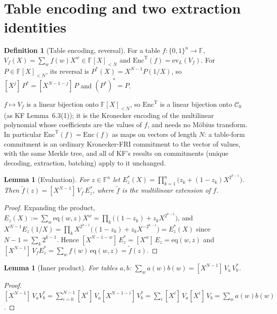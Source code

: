 \documentclass[11pt]{article}
\newtheorem{lemma}[theorem]{Lemma}
\theoremstyle{definition}
\newtheorem{definition}[theorem]{Definition}
\newcommand{\F}{\mathbb{F}}
\newcommand{\coef}[2]{[X^{#1}]\,#2}
\newcommand{\ev}{\mathrm{ev}}
\newcommand{\Cc}{\mathcal{C}}
\begin{document}
\section{Table encoding and two extraction identities}

\begin{definition}[Table encoding, reversal]
For a table $f:\{0,1\}^n\to\F$, $V_f(X)=\sum_{w}f(w)X^{w}\in\F[X]_{<N}$ and $\mathrm{Enc}^{\mathrm T}(f)=\ev_L(V_f)$.
For $P\in\F[X]_{<N}$, its reversal is $P^\ast(X)=X^{N-1}P(1/X)$, so $\coef{j}{P^\ast}=\coef{N-1-j}{P}$ and $(P^\ast)^\ast=P$.
\end{definition}

$f\mapsto V_f$ is a linear bijection onto $\F[X]_{<N}$, so $\mathrm{Enc}^{\mathrm T}$ is a linear bijection onto $\Cc_0$ (as KF Lemma~6.3(1)); it is the Kronecker encoding of the multilinear polynomial whose coefficients are the values of $f$, and needs no M\"obius transform.
In particular $\mathrm{Enc}^{\mathrm T}(f)=\mathrm{Enc}(f)$ as maps on vectors of length $N$: a table-form commitment is an ordinary Kronecker-FRI commitment to the vector of values, with the same Merkle tree, and all of KF's results on commitments (unique decoding, extraction, batching) apply to it unchanged.

\begin{lemma}[Evaluation]\label{lem:eval}
For $z\in\F^n$ let $E^\ast_z(X)=\prod_{k=1}^n\bigl(z_k+(1-z_k)X^{2^{k-1}}\bigr)$. Then $\tilde f(z)=\coef{N-1}{V_f\,E^\ast_z}$, where $\tilde f$ is the multilinear extension of $f$.
\end{lemma}
\begin{proof}
Expanding the product, $E_z(X):=\sum_w \mathrm{eq}(w,z)X^w=\prod_k\bigl((1-z_k)+z_kX^{2^{k-1}}\bigr)$, and $X^{N-1}E_z(1/X)=\prod_kX^{2^{k-1}}\bigl((1-z_k)+z_kX^{-2^{k-1}}\bigr)=E^\ast_z(X)$ since $N-1=\sum_k2^{k-1}$.
Hence $\coef{N-1-w}{E^\ast_z}=\coef{w}{E_z}=\mathrm{eq}(w,z)$ and $\coef{N-1}{V_fE^\ast_z}=\sum_wf(w)\,\mathrm{eq}(w,z)=\tilde f(z)$.
\end{proof}

\begin{lemma}[Inner product]\label{lem:ip}
For tables $a,b$: $\sum_{w}a(w)b(w)=\coef{N-1}{V_a\,V_b^\ast}$.
\end{lemma}
\begin{proof}
$\coef{N-1}{V_aV_b^\ast}=\sum_{i=0}^{N-1}\coef{i}{V_a}\coef{N-1-i}{V_b^\ast}=\sum_i\coef{i}{V_a}\coef{i}{V_b}=\sum_wa(w)b(w)$.
\end{proof}
\end{document}
